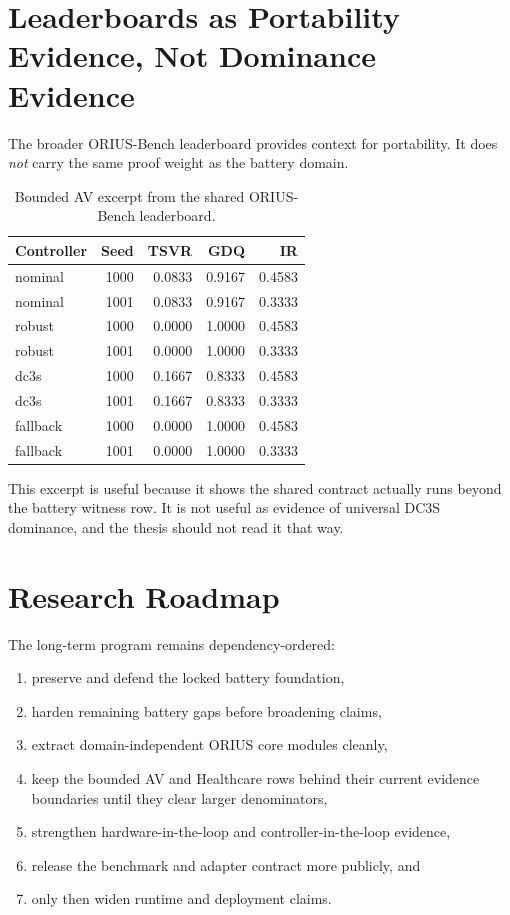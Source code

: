 \section{Leaderboards as Portability Evidence, Not Dominance Evidence}

The broader ORIUS-Bench leaderboard provides context for portability.  It
does \emph{not} carry the same proof weight as the battery domain.

\begin{table}[ht]
\centering
\caption{Bounded AV excerpt from the shared ORIUS-Bench leaderboard.}
\label{tab:vehicle-leaderboard-excerpt}
\begin{tabular}{lrrrr}
\toprule
\textbf{Controller} & \textbf{Seed} & \textbf{TSVR} & \textbf{GDQ} & \textbf{IR} \\
\midrule
nominal & 1000 & 0.0833 & 0.9167 & 0.4583 \\
nominal & 1001 & 0.0833 & 0.9167 & 0.3333 \\
robust  & 1000 & 0.0000 & 1.0000 & 0.4583 \\
robust  & 1001 & 0.0000 & 1.0000 & 0.3333 \\
dc3s    & 1000 & 0.1667 & 0.8333 & 0.4583 \\
dc3s    & 1001 & 0.1667 & 0.8333 & 0.3333 \\
fallback& 1000 & 0.0000 & 1.0000 & 0.4583 \\
fallback& 1001 & 0.0000 & 1.0000 & 0.3333 \\
\bottomrule
\end{tabular}
\end{table}

This excerpt is useful because it shows the shared contract actually runs beyond
the battery witness row.  It is not useful as evidence of universal DC3S dominance,
and the thesis should not read it that way.

\section{Research Roadmap}

The long-term program remains dependency-ordered:

\begin{enumerate}
  \item preserve and defend the locked battery foundation,
  \item harden remaining battery gaps before broadening claims,
  \item extract domain-independent ORIUS core modules cleanly,
  \item keep the bounded AV and Healthcare rows behind their current evidence
    boundaries until they clear larger denominators,
  \item strengthen hardware-in-the-loop and controller-in-the-loop evidence,
  \item release the benchmark and adapter contract more publicly, and
  \item only then widen runtime and deployment claims.
\end{enumerate}

